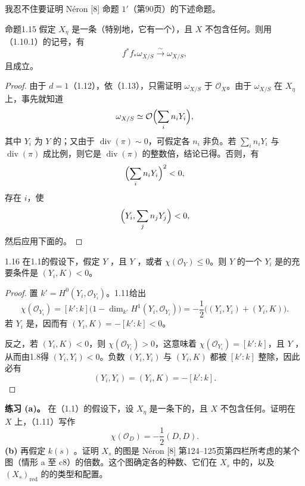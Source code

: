 我忍不住要证明 Néron [8] 命题 $1'$（第90页）的下述命题。
\begin{SGAresult}{命题}{1.15}
假定 $X_\eta$ 是一条（特别地，它有一个），且 $X$ 不包含任何。则用（1.10.1）的记号，有
\[
f^*f_*\omega_{X/S}\xrightarrow{\sim}\omega_{X/S},
\]
且成立。
\end{SGAresult}
\begin{proof}
由于 $d=1$（1.12），依（1.13），只需证明 $\omega_{X/S}$ 于 $\mathcal O_X$。由于 $\omega_{X/S}$ 在 $X_\eta$ 上，事先就知道
\[
\omega_{X/S}\simeq\mathcal O\Bigl(\sum_i n_iY_i\Bigr),
\]
其中 $Y_i$ 为 $Y$ 的；又由于 $\operatorname{div}(\pi)\sim0$，可假定各 $n_i$ 非负。若 $\sum_i n_iY_i$ 与 $\operatorname{div}(\pi)$ 成比例，则它是 $\operatorname{div}(\pi)$ 的整数倍，结论已得。否则，有
\[
\Bigl(\sum_i n_iY_i\Bigr)^2<0,
\]
存在 $i$，使
\[
\Bigl(Y_i,\sum_jn_jY_j\Bigr)<0,
\]
然后应用下面的。
\end{proof}
\begin{SGAresult}{}{1.16}
在1.1的假设下，假定 $Y$ ，且 $Y$ ，或者 $\chi(\mathcal O_Y)\leq0$。则 $Y$ 的一个 $Y_i$ 是的充要条件是 $(Y_i,K)<0$。
\end{SGAresult}
\begin{proof}
置 $k'=H^0(Y_i,\mathcal O_{Y_i})$。1.11给出
\[
\chi(\mathcal O_{Y_i})=[k':k]\bigl(1-\dim_{k'}H^1(Y_i,\mathcal O_{Y_i})\bigr)
=-\frac12\bigl((Y_i,Y_i)+(Y_i,K)\bigr).
\]
若 $Y_i$ 是，因而有 $(Y_i,K)=-[k':k]<0$。

反之，若 $(Y_i,K)<0$，则 $\chi(\mathcal O_{Y_i})>0$，这意味着 $\chi(\mathcal O_{Y_i})=[k':k]$，且 $Y$ ，从而由1.8得 $(Y_i,Y_i)<0$。负数 $(Y_i,Y_i)$ 与 $(Y_i,K)$ 都被 $[k':k]$ 整除，因此必有
\[
(Y_i,Y_i)=(Y_i,K)=-[k':k].
\]
\end{proof}
\textbf{练习 (a)。} 在（1.1）的假设下，设 $X_\eta$ 是一条下的，且 $X$ 不包含任何。证明在 $X$ 上，（1.11）写作
\[
\chi(\mathcal O_D)=-\frac12(D,D).
\]
\textbf{(b)} 再假定 $k(s)$ 。证明 $X_s$ 的图是 Néron [8] 第124--125页第四栏所考虑的某个图（情形 a 至 c8）的倍数。这个图确定各的种数、它们在 $X_s$ 中的，以及 $(X_s)_{\mathrm{red}}$ 的的类型和配置。

